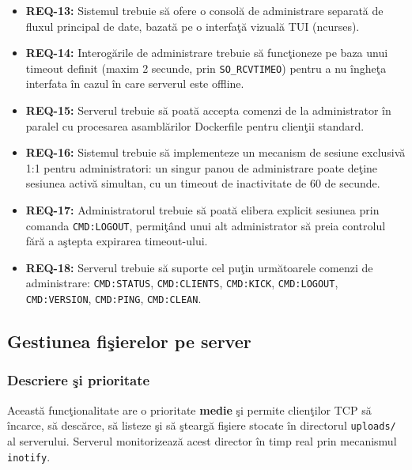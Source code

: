 \documentclass[12pt, a4paper]{article}
\begin{document}
\begin{itemize}
    \item \textbf{REQ-13:} Sistemul trebuie s\u{a} ofere o consol\u{a} de administrare separat\u{a} de fluxul
    principal de date, bazat\u{a} pe o interfa\c{t}\u{a} vizual\u{a} TUI (ncurses).
    \item \textbf{REQ-14:} Interog\u{a}rile de administrare trebuie s\u{a} func\c{t}ioneze pe baza unui timeout
    definit (maxim 2 secunde, prin \texttt{SO\_RCVTIMEO}) pentru a nu \^{i}nghe\c{t}a interfata \^{i}n cazul \^{i}n care
    serverul este offline.
    \item \textbf{REQ-15:} Serverul trebuie s\u{a} poat\u{a} accepta comenzi de la administrator \^{i}n paralel
    cu procesarea asambl\u{a}rilor Dockerfile pentru clien\c{t}ii standard.
    \item \textbf{REQ-16:} Sistemul trebuie s\u{a} implementeze un mecanism de sesiune exclusiv\u{a} 1:1
    pentru administratori: un singur panou de administrare poate de\c{t}ine sesiunea activ\u{a} simultan, cu un
    timeout de inactivitate de 60 de secunde.
    \item \textbf{REQ-17:} Administratorul trebuie s\u{a} poat\u{a} elibera explicit sesiunea prin comanda
    \texttt{CMD:LOGOUT}, permi\c{t}\^{a}nd unui alt administrator s\u{a} preia controlul f\u{a}r\u{a} a a\c{s}tepta expirarea
    timeout-ului.
    \item \textbf{REQ-18:} Serverul trebuie s\u{a} suporte cel pu\c{t}in urm\u{a}toarele comenzi de administrare:
    \texttt{CMD:STATUS}, \texttt{CMD:CLIENTS}, \texttt{CMD:KICK}, \texttt{CMD:LOGOUT}, \texttt{CMD:VERSION},
    \texttt{CMD:PING}, \texttt{CMD:CLEAN}.
\end{itemize}

\subsection{Gestiunea fi\c{s}ierelor pe server}

\subsubsection{Descriere \c{s}i prioritate}

Aceast\u{a} func\c{t}ionalitate are o prioritate \textbf{medie} \c{s}i permite clien\c{t}ilor TCP s\u{a} \^{i}ncarce, s\u{a}
desc\u{a}rce, s\u{a} listeze \c{s}i s\u{a} \c{s}tearg\u{a} fi\c{s}iere stocate \^{i}n directorul \texttt{uploads/} al serverului.
Serverul monitorizeaz\u{a} acest director \^{i}n timp real prin mecanismul \texttt{inotify}.
\end{document}
